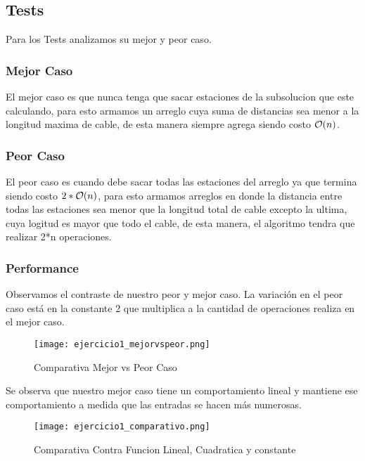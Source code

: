 \subsection{Tests}
Para los Tests analizamos su mejor y peor caso.
    \subsubsection{Mejor Caso}
        El mejor caso es que nunca tenga que sacar estaciones de la subsolucion que este calculando, para esto armamos un arreglo cuya suma de distancias sea menor a la longitud maxima de cable, de esta manera siempre agrega siendo costo $\mathcal{O}(n)$. \newline
    
    
    \subsubsection{Peor Caso}
        El peor caso es cuando debe sacar todas las estaciones del arreglo ya que termina siendo costo $2 * \mathcal{O}(n)$, para esto armamos arreglos en donde la distancia entre todas las estaciones sea menor que la longitud total de cable excepto la ultima, cuya logitud es mayor que todo el cable, de esta manera, el algoritmo tendra que realizar 2*n operaciones. \newline
    
    
    \pagebreak
    
    \subsubsection{Performance}
    
    Observamos el contraste de nuestro peor y mejor caso. La variaci\'on en el peor caso est\'a en la constante 2 que multiplica a la cantidad de operaciones realiza en el mejor caso.
    
    \begin{figure}[h!]
    \texttt{[image: ejercicio1\_mejorvspeor.png]}
    \centering
    \caption{Comparativa Mejor vs Peor Caso}
    \label{overflow3}
    \end{figure}
    
        Se observa que nuestro mejor caso tiene un comportamiento lineal y mantiene ese comportamiento a medida que las entradas se hacen m\'as numerosas. 
    
    \begin{figure}[h!]
    \texttt{[image: ejercicio1\_comparativo.png]}
    \centering
    \caption{Comparativa Contra Funcion Lineal, Cuadratica y constante}
    \label{overflow3}
    \end{figure}

\pagebreak